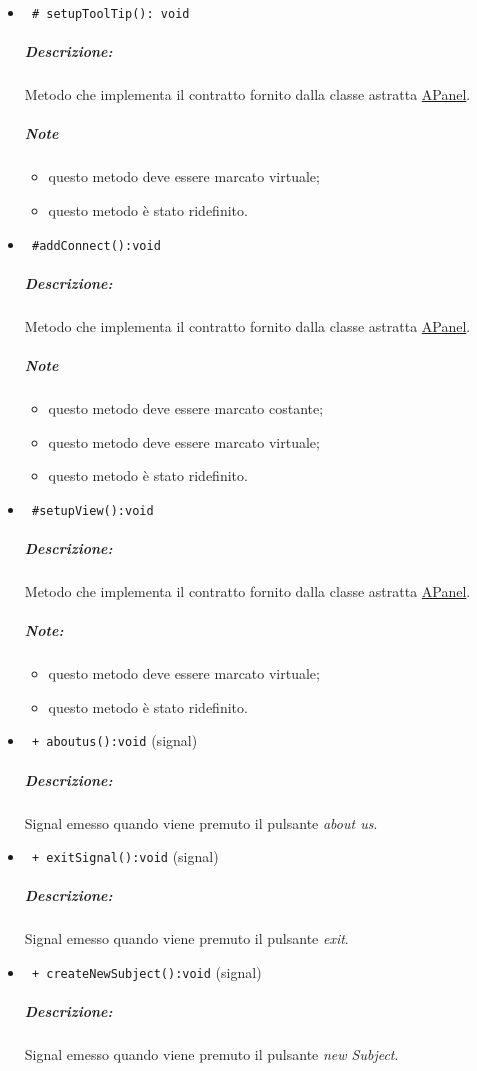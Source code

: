 \begin{itemize}
\item\color{blue}\verb! # setupToolTip(): void!
\color{black} 
\subparagraph{Descrizione: }Metodo che implementa il contratto fornito dalla classe astratta \hyperref[speAPanel]{APanel}.\\
 \subparagraph{Note}
 \begin{itemize}
 \item questo metodo deve essere marcato virtuale;
 \item questo metodo è stato ridefinito.
 \end{itemize}
 
\item\color{blue}\verb! #addConnect():void!
\color{black} 
\subparagraph{Descrizione: }Metodo che implementa il contratto fornito dalla classe astratta \hyperref[speAPanel]{APanel}.\\
 \subparagraph{Note}
 \begin{itemize}
 \item questo metodo deve essere marcato costante;
 \item questo metodo deve essere marcato virtuale;
 \item questo metodo è stato ridefinito.
 \end{itemize}

\item\color{blue}\verb! #setupView():void!
\color{black}
\subparagraph{Descrizione: }
Metodo che implementa il contratto fornito dalla classe astratta \hyperref[speAPanel]{APanel}.
\subparagraph{Note:}
\begin{itemize}
\item questo metodo deve essere marcato virtuale;
\item questo metodo è stato ridefinito.
\end{itemize}
\item\color{blue}\verb! + aboutus():void! (signal)
\color{black} 
\subparagraph{Descrizione:} Signal\g{} emesso quando viene premuto il pulsante \textit{about us}.

\item \color{blue}\verb! + exitSignal():void! (signal)
\color{black} 
\subparagraph{Descrizione:} Signal\g{} emesso quando viene premuto il pulsante \textit{exit}.

\item \color{blue}\verb! + createNewSubject():void! (signal)
\color{black} 
\subparagraph{Descrizione:} Signal\g{} emesso quando viene premuto il pulsante \textit{new Subject}.


\end{itemize}

